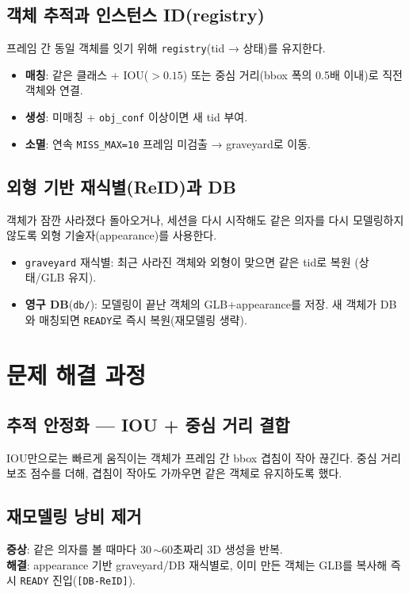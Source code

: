 \section{객체 추적과 인스턴스 ID(registry)}
프레임 간 동일 객체를 잇기 위해 \texttt{registry}(tid → 상태)를 유지한다.
\begin{itemize}
  \item \textbf{매칭}: 같은 클래스 + IOU($>0.15$) 또는 중심 거리(bbox 폭의 0.5배 이내)로
        직전 객체와 연결.
  \item \textbf{생성}: 미매칭 + \texttt{obj\_conf} 이상이면 새 tid 부여.
  \item \textbf{소멸}: 연속 \texttt{MISS\_MAX=10} 프레임 미검출 → graveyard로 이동.
\end{itemize}

\section{외형 기반 재식별(ReID)과 DB}
객체가 잠깐 사라졌다 돌아오거나, 세션을 다시 시작해도 같은 의자를 다시
모델링하지 않도록 외형 기술자(appearance)를 사용한다.
\begin{itemize}
  \item \texttt{graveyard} 재식별: 최근 사라진 객체와 외형이 맞으면 같은 tid로 복원
        (상태/GLB 유지).
  \item \textbf{영구 DB}(\texttt{db/}): 모델링이 끝난 객체의 GLB+appearance를 저장.
        새 객체가 DB와 매칭되면 \texttt{READY}로 즉시 복원(재모델링 생략).
\end{itemize}

\chapter{문제 해결 과정}

\section{추적 안정화 — IOU + 중심 거리 결합}
IOU만으로는 빠르게 움직이는 객체가 프레임 간 bbox 겹침이 작아 끊긴다. 중심
거리 보조 점수를 더해, 겹침이 작아도 가까우면 같은 객체로 유지하도록 했다.

\section{재모델링 낭비 제거}
\textbf{증상}: 같은 의자를 볼 때마다 30\,$\sim$60초짜리 3D 생성을 반복.\\
\textbf{해결}: appearance 기반 graveyard/DB 재식별로, 이미 만든 객체는 GLB를
복사해 즉시 \texttt{READY} 진입(\texttt{[DB-ReID]}).
